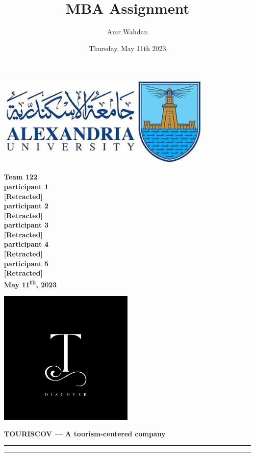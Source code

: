 \documentclass[12pt]{article}
\title{MBA Assignment}
\author{Amr Wahdan}
\date{Thursday, May 11th 2023}
\renewcommand{\maketitle}{
\begin{center}
    \Huge\textbf{Team 122} \\ 
    \vspace{1em}
    \Large\bfseries participant 1 \\
    {[Retracted]} \\
    \Large\bfseries participant 2\\
    {[Retracted]} \\
    \Large\bfseries participant 3 \\
    {[Retracted]} \\
    \Large\bfseries participant 4\\
    {[Retracted]} \\
    \Large\bfseries participant 5\\
    {[Retracted]} \\

    \vspace{1em}
    \large May 11\textsuperscript{th}, 2023
\end{center}
}
\begin{document}

\begin{center}
    \includegraphics[width=0.8\textwidth]{uniLogo.jpg}  
\end{center}
\vspace{1em}
\begin{center}
\end{center}
\vspace{1em}
\maketitle
{}
\newpage

\begin{center}
    \includegraphics[width=0.5\textwidth]{miniMBA.png}  
\end{center}
\vspace{1em}

\begin{center}
    \Large\bfseries TOURISCOV --- A tourism-centered company
    \vspace{0.5em}
    \hrule\vspace{0.2em}\hrule
\end{center}
\end{document}
